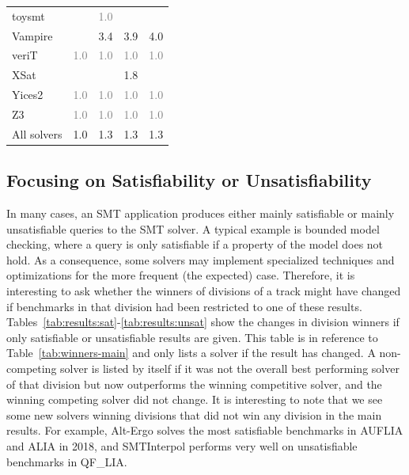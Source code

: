 \documentclass[dvipsnames,table,twoside,11pt]{article}
\begin{document}
\begin{table}
\begin{tabular}{lrrrr}
    toysmt            &     & \textcolor{gray}{1.0} &     &     \\
    Vampire           &     & 3.4 & 3.9 & 4.0 \\
    veriT             & \textcolor{gray}{1.0} & \textcolor{gray}{1.0} & \textcolor{gray}{1.0} & \textcolor{gray}{1.0} \\
    XSat              &     &     & 1.8 &     \\
    Yices2            & \textcolor{gray}{1.0} & \textcolor{gray}{1.0} & \textcolor{gray}{1.0} & \textcolor{gray}{1.0} \\
    Z3                & \textcolor{gray}{1.0} & \textcolor{gray}{1.0} & \textcolor{gray}{1.0} & \textcolor{gray}{1.0} \\
    \midrule
    All solvers       & 1.0 & 1.3 & 1.3 & 1.3 \\
    \bottomrule
  \end{tabular}
\end{table}

\subsection{Focusing on Satisfiability or Unsatisfiability}

In many cases, an SMT application produces either mainly satisfiable or mainly
unsatisfiable queries to the SMT solver.  A typical example is bounded model checking,
where a query is only satisfiable if a property of the model does not hold.  As
a consequence, some solvers may implement specialized techniques and
optimizations for the more frequent (the expected) case.
%
Therefore, it is interesting to ask whether the winners of divisions of a track
might have changed if benchmarks in that division had been restricted to one of
these results.  Tables~\ref{tab:results:sat}-\ref{tab:results:unsat} show the
changes in division winners if only satisfiable or unsatisfiable results are
given. This table is in reference to Table~\ref{tab:winners-main} and only
lists a solver if the result has changed. A non-competing solver is listed by
itself if it was not the overall best performing solver of that division but
now outperforms the winning competitive solver, and the winning competing
solver did not change.
It is interesting to note that we see some new solvers winning divisions that did not win any division in the main results. For example, Alt-Ergo solves the most satisfiable benchmarks in AUFLIA and ALIA in 2018, and SMTInterpol performs very well on unsatisfiable benchmarks in QF\_LIA.
\end{document}
